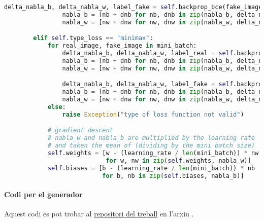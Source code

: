 \begin{lstlisting}[language=Python, caption=Codi final pel discriminador]
				delta_nabla_b, delta_nabla_w, label_fake = self.backprop_bce(fake_image, np.array([0.]))
				nabla_b = [nb + dnb for nb, dnb in zip(nabla_b, delta_nabla_b)]
				nabla_w = [nw + dnw for nw, dnw in zip(nabla_w, delta_nabla_w)]

		elif self.type_loss == "minimax":
			for real_image, fake_image in mini_batch:
				delta_nabla_b, delta_nabla_w, label_real = self.backprop_minimax(real_image, fake_image, True)
				nabla_b = [nb + dnb for nb, dnb in zip(nabla_b, delta_nabla_b)]
				nabla_w = [nw + dnw for nw, dnw in zip(nabla_w, delta_nabla_w)]

				delta_nabla_b, delta_nabla_w, label_fake = self.backprop_minimax(real_image, fake_image, False)
				nabla_b = [nb + dnb for nb, dnb in zip(nabla_b, delta_nabla_b)]
				nabla_w = [nw + dnw for nw, dnw in zip(nabla_w, delta_nabla_w)]
			else:
				raise Exception("type of loss function not valid")

			# gradient descent
			# nabla_w and nabla_b are multiplied by the learning rate
			# and taken the mean of (dividing by the mini batch size)
			self.weights = [w - (learning_rate / len(mini_batch)) * nw
							for w, nw in zip(self.weights, nabla_w)]
			self.biases = [b - (learning_rate / len(mini_batch)) * nb
						   for b, nb in zip(self.biases, nabla_b)]
\end{lstlisting}

\paragraph{Codi per el generador}
\label{lst:gen_final}
Aquest codi es pot trobar al \href{https://github.com/tomiock/qGAN}{repositori del treball} en l'arxiu . 

